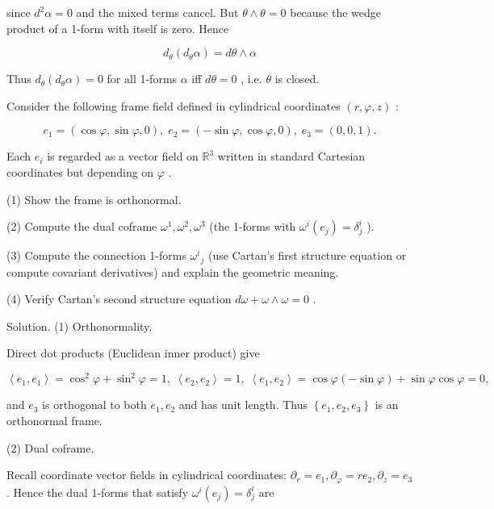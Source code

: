 \documentclass[10pt]{article}
\begin{document}
since \({d}^{2}\alpha  = 0\) and the mixed terms cancel. But \(\theta  \land  \theta  = 0\) because the wedge product of a 1-form with itself is zero. Hence

\[
{d}_{\theta }\left( {{d}_{\theta }\alpha }\right)  = {d\theta } \land  \alpha
\]

Thus \({d}_{\theta }\left( {{d}_{\theta }\alpha }\right)  = 0\) for all 1-forms \(\alpha\) iff \({d\theta } = 0\) , i.e. \(\theta\) is closed.

\begin{problem}[title=PROBLEM 3 (5 POINTS)]
Consider the following frame field defined in cylindrical coordinates \(\left( {r,\varphi ,z}\right)\) :

\[
{e}_{1} = \left( {\cos \varphi ,\sin \varphi ,0}\right) ,\;{e}_{2} = \left( {-\sin \varphi ,\cos \varphi ,0}\right) ,\;{e}_{3} = \left( {0,0,1}\right) .
\]

Each \({e}_{i}\) is regarded as a vector field on \({\mathbb{R}}^{3}\) written in standard Cartesian coordinates but depending on \(\varphi\) .

(1) Show the frame is orthonormal.

(2) Compute the dual coframe \({\omega }^{1},{\omega }^{2},{\omega }^{3}\) (the 1-forms with \({\omega }^{i}\left( {e}_{j}\right)  = {\delta }_{j}^{i}\) ).

(3) Compute the connection 1-forms \({\omega }^{i}{}_{j}\) (use Cartan’s first structure equation or compute covariant derivatives) and explain the geometric meaning.

(4) Verify Cartan’s second structure equation \({d\omega } + \omega  \land  \omega  = 0\) .
\end{problem}

Solution. (1) Orthonormality.

Direct dot products (Euclidean inner product) give

\[
\left\langle  {{e}_{1},{e}_{1}}\right\rangle   = {\cos }^{2}\varphi  + {\sin }^{2}\varphi  = 1,\;\left\langle  {{e}_{2},{e}_{2}}\right\rangle   = 1,\;\left\langle  {{e}_{1},{e}_{2}}\right\rangle   = \cos \varphi \left( {-\sin \varphi }\right)  + \sin \varphi \cos \varphi  = 0,
\]

and \({e}_{3}\) is orthogonal to both \({e}_{1},{e}_{2}\) and has unit length. Thus \(\left\{  {{e}_{1},{e}_{2},{e}_{3}}\right\}\) is an orthonormal frame.

(2) Dual coframe.

Recall coordinate vector fields in cylindrical coordinates: \({\partial }_{r} = {e}_{1},{\partial }_{\varphi } = r{e}_{2},{\partial }_{z} = {e}_{3}\) . Hence the dual 1-forms that satisfy \({\omega }^{i}\left( {e}_{j}\right)  = {\delta }_{j}^{i}\) are
\end{document}
